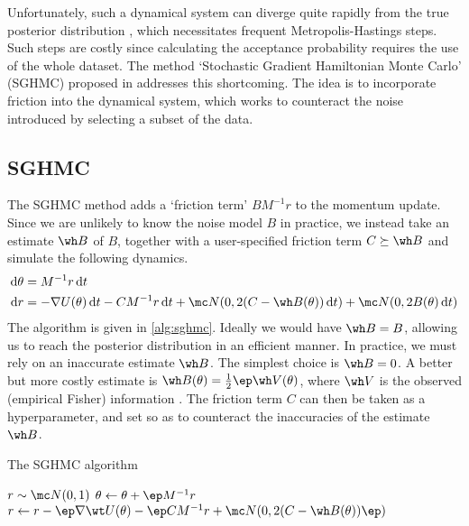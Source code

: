 Unfortunately, such a dynamical system can diverge quite rapidly from the true posterior distribution \cite{neal-hmc}, which necessitates frequent Metropolis-Hastings steps. Such steps are costly since calculating the acceptance probability requires the use of the whole dataset. The method `Stochastic Gradient Hamiltonian Monte Carlo' (SGHMC) proposed in \cite{sghmc} addresses this shortcoming. The idea is to incorporate friction into the dynamical system, which works to counteract the noise introduced by selecting a subset of the data.


\subsection{SGHMC}

The SGHMC method adds a `friction term' $B M^{-1} r$ to the momentum update. Since we are unlikely to know the noise model $B$ in practice, we instead take an estimate $\wh B$ of $B$, together with a user-specified friction term $C \succeq \wh B$ and simulate the following dynamics.
\begin{align*}
    \dif\theta &= M^{-1}r \dif t \\
    \dif r &= - \nabla U(\theta) \dif t - CM^{-1}r \dif t + \mc N(0, 2(C - \wh B(\theta))\dif t) + \mc N(0, 2B(\theta) \dif t)
\end{align*}
The algorithm is given in \cref{alg:sghmc}. Ideally we would have $\wh B = B$, allowing us to reach the posterior distribution in an efficient manner. In practice, we must rely on an inaccurate estimate $\wh B$. The simplest choice is $\wh B = 0$. A better but more costly estimate is $\wh B(\theta) = \frac 1 2 \ep \wh V(\theta)$, where $\wh V$ is the observed (empirical Fisher) information \cite{sgld-fisher}. The friction term $C$ can then be taken as a hyperparameter, and set so as to counteract the inaccuracies of the estimate $\wh B$.

\begin{algorithm}
    \caption{The SGHMC algorithm}\label{alg:sghmc}
    \begin{algorithmic}
            \State $r \sim \mc N(0,1)$ 
                \State $\theta \gets \theta + \ep M^{-1}r$
                \State $r \gets r - \ep \nabla \wt U(\theta) - \ep CM^{-1}r + \mc N(0, 2(C- \wh B(\theta))\ep)$
            \EndFor
        \EndFor
    \end{algorithmic}
\end{algorithm}